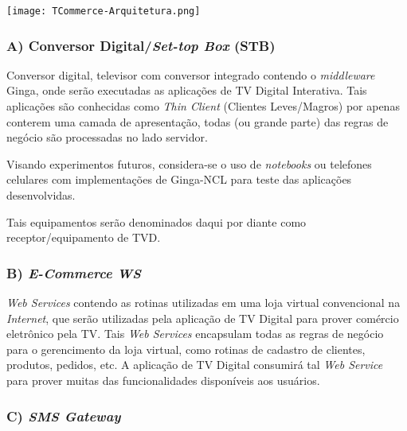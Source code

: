 \begin{center}
	\texttt{[image: TCommerce-Arquitetura.png]}
	\label{fig:arquitetura-tcommerce}
\end{center}

\subsubsection*{A) Conversor Digital/\textit{Set-top Box} (STB)}
Conversor digital, televisor com conversor integrado contendo o \textit{middleware} Ginga,
onde serão executadas as aplicações de TV Digital Interativa. Tais aplicações são conhecidas como
\textit{Thin Client} (Clientes Leves/Magros)\cite{sommerville2011soft} por apenas conterem uma camada de apresentação,
todas (ou grande parte) das regras de negócio são processadas no lado servidor.

Visando experimentos futuros, considera-se o uso de \textit{notebooks} ou telefones celulares com implementações
de Ginga-NCL para teste das aplicações desenvolvidas.

Tais equipamentos serão denominados daqui por diante como receptor/equipamento de TVD.

\subsubsection*{B) \textit{E-Commerce WS}} \label{sec:ecommercews}

\textit{Web Services} contendo as rotinas utilizadas em uma loja virtual convencional
na \textit{Internet}, que serão utilizadas pela aplicação de TV Digital para prover
comércio eletrônico pela TV. Tais \textit{Web Services} encapsulam todas as regras
de negócio para o gerencimento da loja virtual, como rotinas de cadastro de clientes,
produtos, pedidos, etc. A aplicação de TV Digital consumirá tal \textit{Web Service}
para prover muitas das funcionalidades disponíveis aos usuários.


\subsubsection*{C) \textit{SMS Gateway}}

